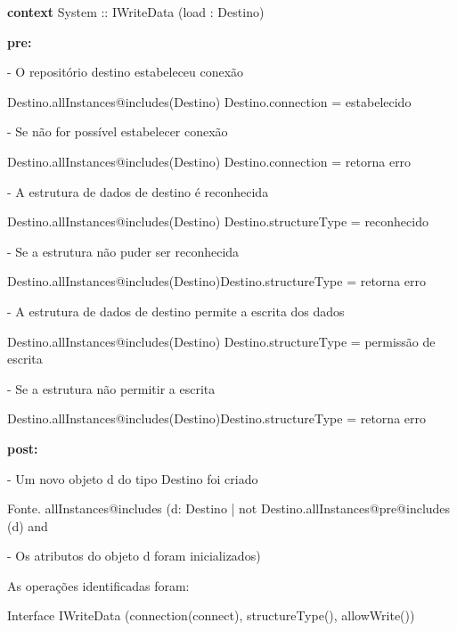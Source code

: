 \begin{minipage}[t][][b]{0.9\textwidth}
\ttfamily

\hrulefill

\textbf{context} System :: IWriteData (load : Destino)


\textbf{pre:}

- O repositório destino estabeleceu conexão

Destino.allInstances@includes(Destino) Destino.connection = estabelecido

- Se não for possível estabelecer conexão

Destino.allInstances@includes(Destino) Destino.connection = retorna  erro

- A estrutura de dados de destino é reconhecida

Destino.allInstances@includes(Destino) Destino.structureType = reconhecido

- Se a estrutura não puder ser reconhecida

Destino.allInstances@includes(Destino)Destino.structureType = retorna  erro

- A estrutura de dados de destino permite a escrita dos dados

Destino.allInstances@includes(Destino) Destino.structureType = permissão de escrita

- Se a estrutura não permitir a escrita

Destino.allInstances@includes(Destino)Destino.structureType = retorna  erro

\textbf{post:}

- Um novo objeto d do tipo Destino foi criado

Fonte. allInstances@includes (d: Destino | not Destino.allInstances@pre@includes (d) and

- Os atributos do objeto d foram inicializados)

\hrulefill

As operações identificadas foram:

Interface IWriteData (connection(connect), structureType(), allowWrite())

\end{minipage}

